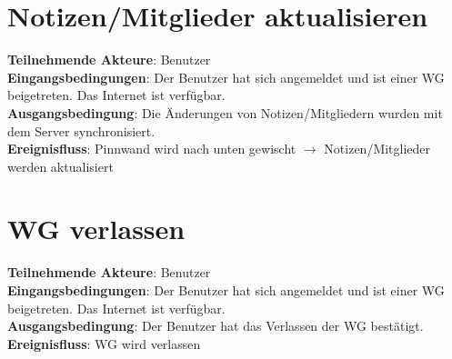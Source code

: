 \documentclass[a4paper]{scrreprt}
\begin{document}
		\section{Notizen/Mitglieder aktualisieren}
		\textbf{Teilnehmende Akteure}: Benutzer \\
		\textbf{Eingangsbedingungen}: Der Benutzer hat sich angemeldet und ist einer WG beigetreten. Das Internet ist verfügbar. \\
		\textbf{Ausgangsbedingung}: Die Änderungen von Notizen/Mitgliedern wurden mit dem Server synchronisiert. \\
		\textbf{Ereignisfluss}: Pinnwand wird nach unten gewischt $\rightarrow$ Notizen/Mitglieder werden aktualisiert
		
		\section{WG verlassen}
		\textbf{Teilnehmende Akteure}: Benutzer \\
		\textbf{Eingangsbedingungen}: Der Benutzer hat sich angemeldet und ist einer WG beigetreten. Das Internet ist verfügbar. \\
		\textbf{Ausgangsbedingung}: Der Benutzer hat das Verlassen der WG bestätigt. \\
		\textbf{Ereignisfluss}: WG wird verlassen
\end{document}
